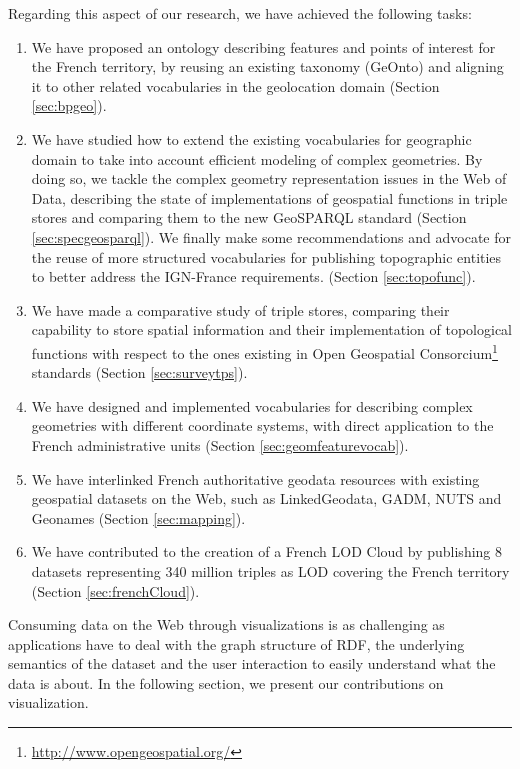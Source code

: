Regarding this aspect of our research, we have achieved the following tasks:
 \begin{enumerate}
 
  \item We have proposed an ontology describing features and points of interest for the French territory, by reusing an existing taxonomy (GeOnto) and aligning it to other related vocabularies in the geolocation domain (Section \ref{sec:bpgeo}).
  \item  We have studied how to extend the existing vocabularies for geographic domain to take into account efficient modeling of complex geometries. By doing so, we tackle the complex geometry representation issues in the Web of Data, describing the state of implementations of geospatial functions in triple stores and comparing them to the new GeoSPARQL standard (Section \ref{sec:specgeosparql}).  We finally make some recommendations and advocate for the reuse of more structured vocabularies for publishing topographic entities to better address the IGN-France requirements. (Section \ref{sec:topofunc}).
  
 \item We have made a comparative study of triple stores, comparing their capability to store spatial information and their implementation of topological functions with respect to the ones 
existing in Open Geospatial Consorcium\footnote{\url{http://www.opengeospatial.org/}} standards (Section \ref{sec:surveytps}).
 \item  We have designed and implemented vocabularies for describing complex geometries with different coordinate systems, with direct application to the French administrative units (Section \ref{sec:geomfeaturevocab}).
 
 \item We have interlinked French authoritative geodata resources with existing geospatial datasets on the Web, such as LinkedGeodata, GADM, NUTS and Geonames (Section \ref{sec:mapping}).
 
 \item We have contributed to the creation of a French LOD Cloud by publishing 8 datasets representing 340 million triples as LOD covering the French territory (Section \ref{sec:frenchCloud}).
 

\end{enumerate}


Consuming data on the Web through visualizations is as challenging as applications have to deal with the graph structure of RDF, the underlying semantics of the dataset and the user interaction to easily understand what the data is about. In the following section, we present our contributions on visualization.
